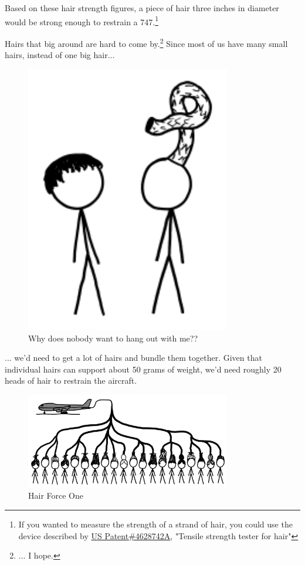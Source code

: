 {{Based on these hair strength figures, a piece of hair three inches in diameter would be strong enough to restrain a 747.{\footnote{If you wanted to measure the strength of a strand of hair, you could use the device described by \href{http://www.google.com/patents/US4628742}{US Patent\#4628742A}, "Tensile strength tester for hair"} } }

{Hairs that big around are hard to come by.{\footnote{... I hope.} } Since most of us have many small hairs, instead of one big hair...}

\begin{figure}[!htbp]
\centering
\includegraphics[scale=0.5, max width=0.8\textwidth]{imgs/a/56/747_single.png}
\caption{Why does nobody want to hang out with me??}
\end{figure}

{... we'd need to get a lot of hairs and bundle them together. Given that individual hairs can support about 50 grams of weight, we'd need roughly 20 heads of hair to restrain the aircraft.}

\begin{figure}[!htbp]
\centering
\includegraphics[scale=0.5, max width=0.8\textwidth]{imgs/a/56/747_hair.png}
\caption{Hair Force One}
\end{figure}

}
